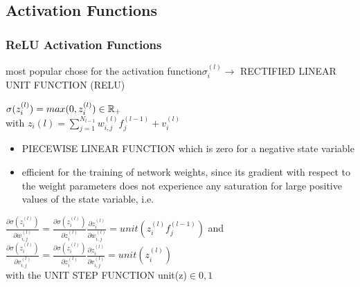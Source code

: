 \begin{sectionbox}
\subsection{Activation Functions}
\subsubsection*{ReLU Activation Functions}
most popular chose for the activation function$\sigma_i^{(l)}\rightarrow$ RECTIFIED LINEAR UNIT FUNCTION (RELU)\\

\begin{emphbox}
$\sigma(z_i^{(l)})=max(0,z_i^{(l)})\in \operatorname{\mathbb R}_+$\\
with $z_i{(l)}=\sum_{j=1}^{N_{l-1}}w_{i,j}^{(l)}f_j^{(l-1)}+v_i^{(l)}$
\end{emphbox}

\begin{itemize}
\item PIECEWISE LINEAR FUNCTION which is zero for a negative state variable
\item efficient for the training of network weights, since its gradient with respect to the weight parameters does not experience any saturation for large positive values of the state variable, i.e.
\end{itemize}

\begin{emphbox}
$\frac{\partial \sigma(z_i^{(l)})}{\partial w_{i,j}^{(l)}}=\frac{\partial\sigma(z_i^{(l)})}{\partial z_i^{(l)}}\frac{\partial z_i^{(l)}}{\partial w_{i,j}^{(l)}}=unit(z_i^{(l)}f_j^{(l-1)})$ and\\
$\frac{\partial \sigma(z_i^{(l)})}{\partial v_{i,j}^{(l)}}=\frac{\partial\sigma(z_i^{(l)})}{\partial z_i^{(l)}}\frac{\partial z_i^{(l)}}{\partial v_{i,j}^{(l)}}=unit(z_i^{(l)})$\\
with the UNIT STEP FUNCTION unit(z)$\in{0,1}$
\end{emphbox}


\end{sectionbox}

